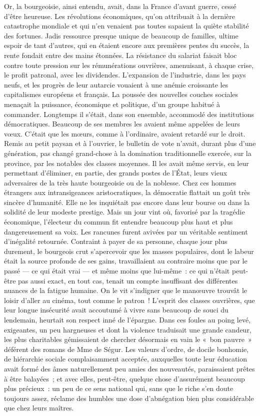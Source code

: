 \documentclass[french,twoside]{book} %
\begin{document}
Or, la bourgeoisie, ainsi entendu, avait, dans la France d’avant guerre, cessé d’être heureuse. Les révolutions économiques, qu’on attribuait à la dernière catastrophe mondiale et qui n’en venaient pas toutes sapaient la quiète stabilité des fortunes. Jadis ressource presque unique de beaucoup de familles, ultime espoir de tant d’autres, qui en étaient encore aux premières pentes du succès, la rente fondait entre des mains étonnées. La résistance du salariat faisait bloc contre toute pression sur les rémunérations ouvrières, amenuisant, à chaque crise, le profit patronal, avec les dividendes. L’expansion de l’industrie, dans les pays neufs, et les progrès de leur autarcie vouaient à une anémie croissante les capitalismes européens et français. La poussée des nouvelles couches sociales menaçait la puissance, économique et politique, d’un groupe habitué à commander. Longtemps il s’était, dans son ensemble, accommodé des institutions démocratiques. Beaucoup de ses membres les avaient même appelées de leurs vœux. C’était que les mœurs, comme à l’ordinaire, avaient retardé sur le droit. Remis au petit paysan et à l’ouvrier, le bulletin de vote n’avait, durant plus d’une génération, pas changé grand-chose à la domination traditionnelle exercée, sur la province, par les notables des classes moyennes. Il les avait même servis, en leur permettant d’éliminer, en partie, des grands postes de l’État, leurs vieux adversaires de la très haute bourgeoisie ou de la noblesse. Chez ces hommes étrangers aux intransigeances aristocratiques, la démocratie flattait un goût très sincère d’humanité. Elle ne les inquiétait pas encore dans leur bourse ou dans la solidité de leur modeste   prestige. Mais un jour vint où, favorisé par la tragédie économique, l’électeur du commun fit entendre beaucoup plus haut et plus dangereusement sa voix. Les rancunes furent avivées par un véritable sentiment d’inégalité retournée. Contraint à payer de sa personne, chaque jour plus durement, le bourgeois crut s’apercevoir que les masses populaires, dont le labeur était la source profonde de ses gains, travaillaient au contraire moins que par le passé — ce qui était vrai — et même moins que lui-même : ce qui n’était peut-être pas aussi exact, en tout cas, tenait un compte insuffisant des différentes nuances de la fatigue humaine. On le vit s’indigner que le manœuvre trouvât le loisir d’aller au cinéma, tout comme le patron ! L’esprit des classes ouvrières, que leur longue insécurité avait accoutumé à vivre sans beaucoup de souci du lendemain, heurtait son respect inné de l’épargne. Dans ces foules au poing levé, exigeantes, un peu hargneuses et dont la violence traduisait une grande candeur, les plus charitables gémissaient de chercher désormais en vain le « bon pauvre » déférent des romans de Mme de Ségur. Les valeurs d’ordre, de docile bonhomie, de hiérarchie sociale complaisamment acceptée, auxquelles toute leur éducation avait formé des âmes naturellement peu amies des nouveautés, paraissaient prêtes à être balayées ; et avec elles, peut-être, quelque chose d’assurément beaucoup plus précieux : un peu de ce sens national qui, sans que le riche s’en doute toujours assez, réclame des humbles une dose d’abnégation bien plus considérable que chez leurs maîtres.\par
\end{document}
